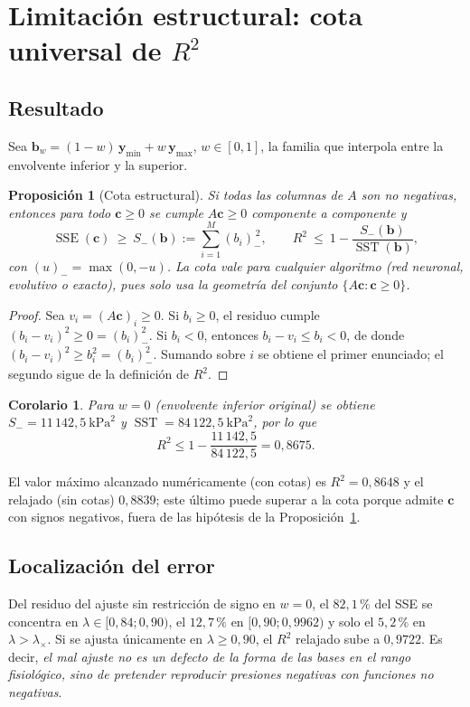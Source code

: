 \documentclass[11pt,twoside]{article}
\newtheorem{proposicion}{Proposición}
\newtheorem{corolario}{Corolario}[proposicion]
\theoremstyle{definition}
\theoremstyle{remark}
\newcommand{\negp}[1]{\left(#1\right)_{-}}
\DeclareMathOperator{\SSE}{SSE}
\DeclareMathOperator{\SST}{SST}
\begin{document}
\section{Limitación estructural: cota universal de $R^2$}\label{sec:cota}
\subsection{Resultado}
Sea $\bm b_w=(1-w)\,\bm y_{\min}+w\,\bm y_{\max}$, $w\in[0,1]$, la familia que interpola entre la envolvente inferior y la superior.

\begin{proposicion}[Cota estructural]\label{prop:cota}
Si todas las columnas de $A$ son no negativas, entonces para todo $\bm c\ge0$ se cumple $A\bm c\ge0$ componente a componente y
\begin{equation}
 \SSE(\bm c)\ \ge\ S_-(\bm b):=\sum_{i=1}^{M}\negp{b_i}^{\,2},\qquad
 R^2\ \le\ 1-\frac{S_-(\bm b)}{\SST(\bm b)},
 \label{eq:cota}
\end{equation}
con $\negp{u}=\max(0,-u)$. La cota vale para cualquier algoritmo (red neuronal, evolutivo o exacto), pues solo usa la geometría del conjunto $\{A\bm c:\bm c\ge0\}$.
\end{proposicion}
\begin{proof}
Sea $v_i=(A\bm c)_i\ge0$. Si $b_i\ge0$, el residuo cumple $(b_i-v_i)^2\ge0=\negp{b_i}^2$. Si $b_i<0$, entonces $b_i-v_i\le b_i<0$, de donde $(b_i-v_i)^2\ge b_i^2=\negp{b_i}^2$. Sumando sobre $i$ se obtiene el primer enunciado; el segundo sigue de la definición de $R^2$.
\end{proof}

\begin{corolario}
Para $w=0$ (envolvente inferior original) se obtiene $S_-=11\,142{,}5\ \mathrm{kPa}^2$ y $\SST=84\,122{,}5\ \mathrm{kPa}^2$, por lo que
\begin{equation}
 R^2\le 1-\frac{11\,142{,}5}{84\,122{,}5}=0{,}8675 .
\end{equation}
\end{corolario}
El valor máximo alcanzado numéricamente (con cotas) es $R^2=0{,}8648$ y el relajado (sin cotas) $0{,}8839$; este último puede superar a la cota porque admite $\bm c$ con signos negativos, fuera de las hipótesis de la Proposición~\ref{prop:cota}.

\subsection{Localización del error}
Del residuo del ajuste sin restricción de signo en $w=0$, el $82{,}1\,\%$ del SSE se concentra en $\lambda\in[0{,}84;0{,}90)$, el $12{,}7\,\%$ en $[0{,}90;0{,}9962)$ y solo el $5{,}2\,\%$ en $\lambda>\lambda_\times$. Si se ajusta únicamente en $\lambda\ge0{,}90$, el $R^2$ relajado sube a $0{,}9722$. Es decir, \emph{el mal ajuste no es un defecto de la forma de las bases en el rango fisiológico, sino de pretender reproducir presiones negativas con funciones no negativas}.
\end{document}
